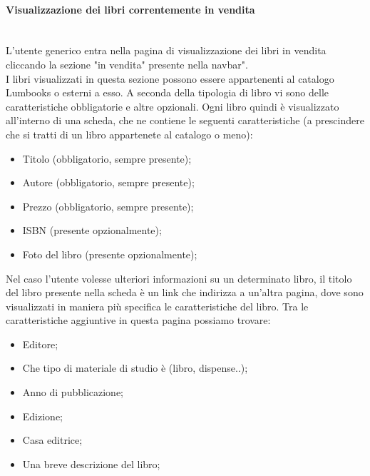 \paragraph{Visualizzazione dei libri correntemente in vendita}\mbox{}\\
\label{par:VisLibriVendita}
L'utente generico entra nella pagina di visualizzazione dei libri in vendita cliccando la sezione "in vendita" presente nella navbar".\\
I libri visualizzati in questa sezione possono essere appartenenti al catalogo Lumbooks o esterni a esso. A seconda della tipologia di libro vi sono delle caratteristiche obbligatorie e altre opzionali. Ogni libro quindi è visualizzato all'interno di una scheda, che ne contiene le seguenti caratteristiche (a prescindere che si tratti di un libro appartenete al catalogo o meno):
\begin{itemize}
	\item Titolo (obbligatorio, sempre presente);
	\item Autore (obbligatorio, sempre presente);
	\item Prezzo (obbligatorio, sempre presente);
	\item ISBN (presente opzionalmente);
	\item Foto del libro (presente opzionalmente);
\end{itemize}
Nel caso l'utente volesse ulteriori informazioni su un determinato libro, il titolo del libro presente nella scheda è un link che indirizza a un'altra pagina, dove sono visualizzati in maniera più specifica le caratteristiche del libro. Tra le caratteristiche aggiuntive in questa pagina possiamo trovare:
\begin{itemize}
	\item Editore;
	\item Che tipo di materiale di studio è (libro, dispense..);
	\item Anno di pubblicazione;
	\item Edizione;
	\item Casa editrice;
	\item Una breve descrizione del libro;
\end{itemize}

